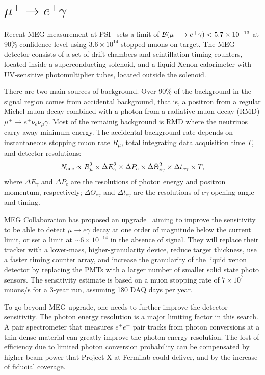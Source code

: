 \section{$\mu^+\to e^+\gamma$}

Recent MEG measurement at PSI~\cite{MEG2013} sets a limit of 
${\cal B}(\mu^+\to e^+\gamma)< 5.7\times 10^{-13}$ at 90\% confidence
level using $3.6\times 10^{14}$ stopped muons on target. The MEG detector
consists of a set of drift chambers and scintillation timing counters,
located inside a superconducting solenoid, and a liquid Xenon 
calorimeter with UV-sensitive photomultiplier tubes, located outside the
solenoid. 

There are two main sources of background. Over 90\% of the background in
the signal region comes from accidental background, that is, a positron
from a regular Michel muon decay combined with a photon from a radiative
muon decay  (RMD) $\mu^+\to e^+ \nu_e\bar\nu_\mu \gamma$.
Most of the remainig background is RMD where the neutrinos carry away minimum
energy. The accidental background rate depends on instantaneous stopping
muon rate $R_\mu$, total integrating data acquisition time $T$, and 
detector resolutions:
\begin{equation}
N_{\rm acc} \propto R_\mu^2 \times \Delta E_\gamma^2 \times\Delta P_e \times
\Delta \Theta_{e\gamma}^2 \times \Delta t_{e \gamma} \times T, 
\end{equation}
where $\Delta E_\gamma$ and $\Delta P_e$ are the resolutions of photon energy
and positron momentum, respectively; $\Delta \Theta_{e\gamma}$ and
$\Delta t_{e \gamma}$ are the resolutions of $e\gamma$ opening angle and
timing.

MEG Collaboration has proposed an upgrade~\cite{MEGupgrade} aiming to 
improve the sensitivity to be able to detect $\mu\to e\gamma$ decay 
at one order of magnitude below the current limit, or set a limit at
$\sim 6\times 10^{-14}$ in the absence of signal. They will replace 
their tracker with a lower-mass, higher-granularity device, reduce target
thickness, use a faster timing counter array, and increase the 
granularity of the liquid xenon detector by replacing the PMTs with 
a larger number of smaller solid state photo sensors. The sensitivity
estimate is based on a muon stopping rate of $7\times 10^7$ muons/s for 
a 3-year run, assuming 180 DAQ days per year.



To go beyond MEG upgrade, one needs to further improve the detector 
sensitivity. 
The photon energy resolution is a major limiting factor in this search.
A pair spectrometer that measures $e^+e^-$ pair tracks from photon
conversions at a thin dense material can greatly improve the photon energy
resolution. The lost of efficiency due to limited photon conversion 
probability can be compensated by higher beam power that Project X at 
Fermilab could deliver, and by the increase of fiducial coverage. 

